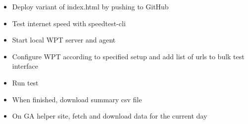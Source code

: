 
\begin{itemize}
\item Deploy variant of index.html by pushing to GitHub
\item Test internet speed with speedtest-cli
\item Start local WPT server and agent
\item Configure WPT according to specified setup and add list of urls to bulk test interface
\item Run test
\item When finished, download summary csv file
\item On GA helper site, fetch and download data for the current day
\end{itemize}








